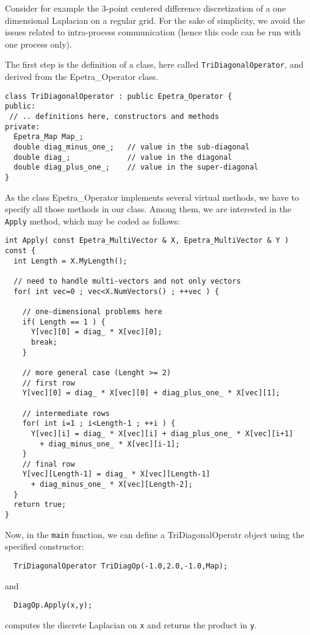 Consider for example the 3-point centered difference discretization of a
one dimensional Laplacian on a regular grid. For the sake of simplicity,
we avoid the issues related to intra-process communication (hence this
code can be run with one process only).

The first step is the definition of a class, here called
\verb!TriDiagonalOperator!, and derived from the Epetra\_Operator class.
\begin{verbatim}
class TriDiagonalOperator : public Epetra_Operator {
public:
 // .. definitions here, constructors and methods
private:
  Epetra_Map Map_;
  double diag_minus_one_;   // value in the sub-diagonal
  double diag_;             // value in the diagonal
  double diag_plus_one_;    // value in the super-diagonal
}
\end{verbatim}
As the class  Epetra\_Operator implements several virtual methods, we
have to specify all those methods in our class. Among them, we are
interested in the \verb!Apply! method, which may be coded as follows:
\begin{verbatim}
int Apply( const Epetra_MultiVector & X, Epetra_MultiVector & Y ) const {
  int Length = X.MyLength();
  
  // need to handle multi-vectors and not only vectors
  for( int vec=0 ; vec<X.NumVectors() ; ++vec ) {
    
    // one-dimensional problems here
    if( Length == 1 ) {
      Y[vec][0] = diag_ * X[vec][0];
      break;
    }
    
    // more general case (Lenght >= 2)
    // first row
    Y[vec][0] = diag_ * X[vec][0] + diag_plus_one_ * X[vec][1];
    
    // intermediate rows
    for( int i=1 ; i<Length-1 ; ++i ) {
      Y[vec][i] = diag_ * X[vec][i] + diag_plus_one_ * X[vec][i+1]
        + diag_minus_one_ * X[vec][i-1];
    }
    // final row
    Y[vec][Length-1] = diag_ * X[vec][Length-1]
      + diag_minus_one_ * X[vec][Length-2];
  }
  return true;
}
\end{verbatim}
Now, in the \verb!main! function, we can define a TriDiagonalOperatr object
using the specified constructor:
\begin{verbatim}
  TriDiagonalOperator TriDiagOp(-1.0,2.0,-1.0,Map);
\end{verbatim}
and
\begin{verbatim}
  DiagOp.Apply(x,y);
\end{verbatim}
computes the discrete Laplacian on \verb!x! and returns the product in
\verb!y!. 

